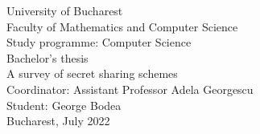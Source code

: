 \documentclass[12pt, a4paper, oneside]{book}
\begin{document}
    \begin{center}
        \LARGE{University of Bucharest}
        \\
        \LARGE{Faculty of Mathematics and Computer Science}
        \vspace{1cm}
        \\
        \LARGE{Study programme: Computer Science}
        \vspace{3cm}
        \\
        \LARGE{Bachelor's thesis}
        \\
        \Huge{A survey of secret sharing schemes}
        \vspace{3cm}
        \\
        \Large{Coordinator: Assistant Professor Adela Georgescu}
        \\
        \Large{Student: George Bodea}
        \\
        \vspace{5cm}
        \Large{Bucharest, July 2022}
    \end{center}
    
    \thispagestyle{empty}
    \newpage

    \thispagestyle{empty}
    \tableofcontents
    
    \thispagestyle{empty}
    \newpage
    
\end{document}

